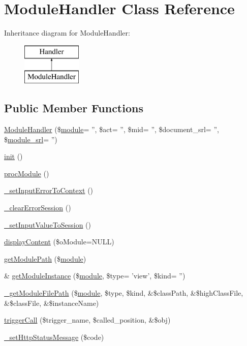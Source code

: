 \hypertarget{classModuleHandler}{\section{Module\+Handler Class Reference}
\label{classModuleHandler}
}
Inheritance diagram for Module\+Handler\+:\begin{figure}[H]
\begin{center}
\leavevmode
\includegraphics[height=2.000000cm]{classModuleHandler}
\end{center}
\end{figure}
\subsection*{Public Member Functions}
\begin{DoxyCompactItemize}
\item 
\hyperlink{classModuleHandler_abfb13533d16d60323823189ccca73237}{Module\+Handler} (\$\hyperlink{classmodule}{module}= '', \$act= '', \$mid= '', \$document\+\_\+srl= '', \$\hyperlink{ko_8install_8php_a370bb6450fab1da3e0ed9f484a38b761}{module\+\_\+srl}= '')
\item 
\hyperlink{classModuleHandler_a4a4671c196a893207c38af84c8ee7da8}{init} ()
\item 
\hyperlink{classModuleHandler_a74ad0ae3090eff1da5a6e0e68ce431d0}{proc\+Module} ()
\item 
\hyperlink{classModuleHandler_aa47d0ccb069d65698ade6f44bf6c705f}{\+\_\+set\+Input\+Error\+To\+Context} ()
\item 
\hyperlink{classModuleHandler_a45c91a72acccf3ee8139538ef5aa1c1d}{\+\_\+clear\+Error\+Session} ()
\item 
\hyperlink{classModuleHandler_ab3837506079a320e2726079777bb2b3e}{\+\_\+set\+Input\+Value\+To\+Session} ()
\item 
\hyperlink{classModuleHandler_a140c43faf30dedf139212294e3e9acf3}{display\+Content} (\$o\+Module=N\+U\+L\+L)
\item 
\hyperlink{classModuleHandler_a0a175bdc5034df0bf4ce66ea0e6e1bf2}{get\+Module\+Path} (\$\hyperlink{classmodule}{module})
\item 
\& \hyperlink{classModuleHandler_aea2e4d82f816ee25ec97ce2c830e6860}{get\+Module\+Instance} (\$\hyperlink{classmodule}{module}, \$type= 'view', \$kind= '')
\item 
\hyperlink{classModuleHandler_a75e1eb90149d7f6e38cfd5dc7a9521d4}{\+\_\+get\+Module\+File\+Path} (\$\hyperlink{classmodule}{module}, \$type, \$kind, \&\$class\+Path, \&\$high\+Class\+File, \&\$class\+File, \&\$instance\+Name)
\item 
\hyperlink{classModuleHandler_aa1b1f9eae91ccd76e6a81c9375c2e673}{trigger\+Call} (\$trigger\+\_\+name, \$called\+\_\+position, \&\$obj)
\item 
\hyperlink{classModuleHandler_a91c14051caea99153975f2335a2dc770}{\+\_\+set\+Http\+Status\+Message} (\$code)
\end{DoxyCompactItemize}

